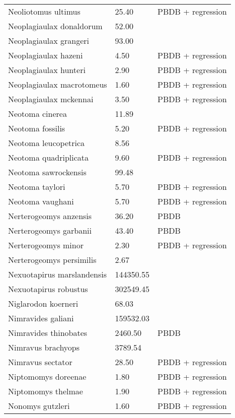 \documentclass{article}
\begin{document}
\begin{center}
\begin{longtable}{p{} p{} p{}}
    Neoliotomus ultimus & 25.40 & PBDB + regression \\ 
    Neoplagiaulax donaldorum & 52.00 & \cite{Wilson2012} \\ 
    Neoplagiaulax grangeri & 93.00 & \cite{Wilson2012} \\ 
    Neoplagiaulax hazeni & 4.50 & PBDB + regression \\ 
    Neoplagiaulax hunteri & 2.90 & PBDB + regression \\ 
    Neoplagiaulax macrotomeus & 1.60 & PBDB + regression \\ 
    Neoplagiaulax mckennai & 3.50 & PBDB + regression \\ 
    Neotoma cinerea & 11.89 & \cite{Smith2004} \\ 
    Neotoma fossilis & 5.20 & PBDB + regression \\ 
    Neotoma leucopetrica & 8.56 & \cite{Grohe2010} \\ 
    Neotoma quadriplicata & 9.60 & PBDB + regression \\ 
    Neotoma sawrockensis & 99.48 & \cite{Tomiya2013} \\ 
    Neotoma taylori & 5.70 & PBDB + regression \\ 
    Neotoma vaughani & 5.70 & PBDB + regression \\ 
    Nerterogeomys anzensis & 36.20 & PBDB \\ 
    Nerterogeomys garbanii & 43.40 & PBDB \\ 
    Nerterogeomys minor & 2.30 & PBDB + regression \\ 
    Nerterogeomys persimilis & 2.67 & \cite{Grohe2010} \\ 
    Nexuotapirus marslandensis & 144350.55 & \cite{Tomiya2013} \\ 
    Nexuotapirus robustus & 302549.45 & \cite{Tomiya2013} \\ 
    Niglarodon koerneri & 68.03 & \cite{Tomiya2013} \\ 
    Nimravides galiani & 159532.03 & \cite{Tomiya2013} \\ 
    Nimravides thinobates & 2460.50 & PBDB \\ 
    Nimravus brachyops & 3789.54 & \cite{Tomiya2013} \\ 
    Nimravus sectator & 28.50 & PBDB + regression \\ 
    Niptomomys doreenae & 1.80 & PBDB + regression \\ 
    Niptomomys thelmae & 1.90 & PBDB + regression \\ 
    Nonomys gutzleri & 1.60 & PBDB + regression \\ 

\end{longtable}
\end{center}
\end{document}
